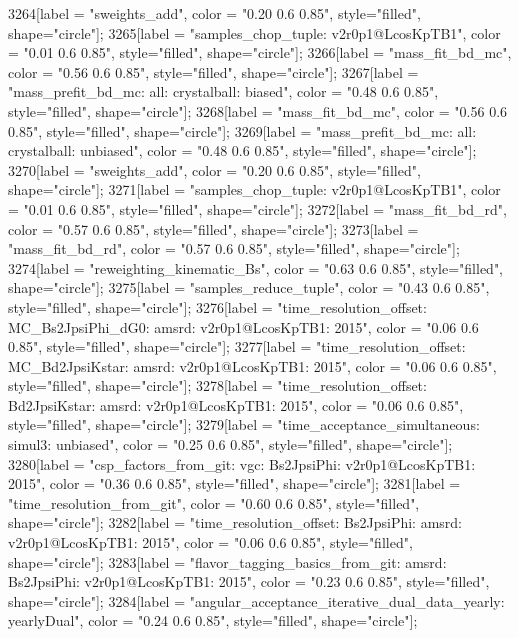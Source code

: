 {	3264[label = "sweights_add", color = "0.20 0.6 0.85", style="filled", shape="circle"];
	3265[label = "samples_chop_tuple\nversion: v2r0p1@LcosKpTB1", color = "0.01 0.6 0.85", style="filled", shape="circle"];
	3266[label = "mass_fit_bd_mc", color = "0.56 0.6 0.85", style="filled", shape="circle"];
	3267[label = "mass_prefit_bd_mc\nmassbin: all\nmassmodel: crystalball\ntrigger: biased", color = "0.48 0.6 0.85", style="filled", shape="circle"];
	3268[label = "mass_fit_bd_mc", color = "0.56 0.6 0.85", style="filled", shape="circle"];
	3269[label = "mass_prefit_bd_mc\nmassbin: all\nmassmodel: crystalball\ntrigger: unbiased", color = "0.48 0.6 0.85", style="filled", shape="circle"];
	3270[label = "sweights_add", color = "0.20 0.6 0.85", style="filled", shape="circle"];
	3271[label = "samples_chop_tuple\nversion: v2r0p1@LcosKpTB1", color = "0.01 0.6 0.85", style="filled", shape="circle"];
	3272[label = "mass_fit_bd_rd", color = "0.57 0.6 0.85", style="filled", shape="circle"];
	3273[label = "mass_fit_bd_rd", color = "0.57 0.6 0.85", style="filled", shape="circle"];
	3274[label = "reweighting_kinematic_Bs", color = "0.63 0.6 0.85", style="filled", shape="circle"];
	3275[label = "samples_reduce_tuple", color = "0.43 0.6 0.85", style="filled", shape="circle"];
	3276[label = "time_resolution_offset\nmode: MC_Bs2JpsiPhi_dG0\ntimeres: amsrd\nversion: v2r0p1@LcosKpTB1\nyear: 2015", color = "0.06 0.6 0.85", style="filled", shape="circle"];
	3277[label = "time_resolution_offset\nmode: MC_Bd2JpsiKstar\ntimeres: amsrd\nversion: v2r0p1@LcosKpTB1\nyear: 2015", color = "0.06 0.6 0.85", style="filled", shape="circle"];
	3278[label = "time_resolution_offset\nmode: Bd2JpsiKstar\ntimeres: amsrd\nversion: v2r0p1@LcosKpTB1\nyear: 2015", color = "0.06 0.6 0.85", style="filled", shape="circle"];
	3279[label = "time_acceptance_simultaneous\ntimeacc: simul3\ntrigger: unbiased", color = "0.25 0.6 0.85", style="filled", shape="circle"];
	3280[label = "csp_factors_from_git\ncsp: vgc\nmode: Bs2JpsiPhi\nversion: v2r0p1@LcosKpTB1\nyear: 2015", color = "0.36 0.6 0.85", style="filled", shape="circle"];
	3281[label = "time_resolution_from_git", color = "0.60 0.6 0.85", style="filled", shape="circle"];
	3282[label = "time_resolution_offset\nmode: Bs2JpsiPhi\ntimeres: amsrd\nversion: v2r0p1@LcosKpTB1\nyear: 2015", color = "0.06 0.6 0.85", style="filled", shape="circle"];
	3283[label = "flavor_tagging_basics_from_git\nflavor: amsrd\nmode: Bs2JpsiPhi\nversion: v2r0p1@LcosKpTB1\nyear: 2015", color = "0.23 0.6 0.85", style="filled", shape="circle"];
	3284[label = "angular_acceptance_iterative_dual_data_yearly\nangacc: yearlyDual", color = "0.24 0.6 0.85", style="filled", shape="circle"];
}
